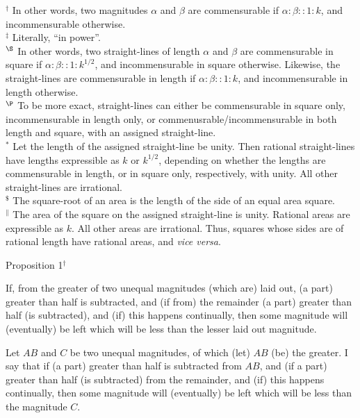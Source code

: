 {\footnotesize\noindent $^\dag$ In other words, two magnitudes $\alpha$ and
$\beta$ are commensurable if $\alpha:\beta::1:k$, and incommensurable otherwise.\\[0.5ex]
$^\ddag$ Literally, ``in power''.\\[0.5ex]
$^\S$  In other words, two straight-lines of length $\alpha$ and $\beta$ are commensurable in square if $\alpha : \beta::1:k^{1/2}$,  and incommensurable in square otherwise. Likewise, the straight-lines
are commensurable in length if $\alpha:\beta::1:k$, and incommensurable in length otherwise.\\[0.5ex]
$^\P$ To be more exact, straight-lines can either be commensurable in square only, incommensurable in length only, or commenusrable/incommensurable in both
length and square, with an assigned straight-line.\\[0.5ex]
$^\ast$ Let the length of the assigned straight-line be unity. Then rational
straight-lines have lengths expressible as $k$ or $k^{1/2}$, depending on whether the lengths are commensurable in length, or in square only, respectively,
with unity.  All other straight-lines are irrational.\\[0.5ex]
$^\$$ The square-root of an area is the length of the side of an equal area square.\\[0.5ex]
$^\|$ The area of the  square 
on the assigned straight-line is unity. Rational areas are expressible as $k$.  All other areas are irrational. Thus, squares whose
sides are of rational length have  rational areas, and {\em vice versa}.}


\begin{center}
{\large Proposition 1}$^\dag$
\end{center}

If, from
the greater of two unequal magnitudes (which are) laid out,  (a part) greater than half is subtracted, and (if from) the remainder (a part) greater than
half (is subtracted), and (if) this happens continually, then some magnitude will (eventually) be left which
will be less than the  lesser laid out magnitude.

Let $AB$ and $C$ be two unequal magnitudes, of which (let) $AB$ (be) the greater. I say that if (a part) greater than half is subtracted  from $AB$,
and (if a part) greater than half (is subtracted) from the remainder, and (if) this happens
continually, then some magnitude will (eventually) be left which will be less
than the magnitude $C$. 

